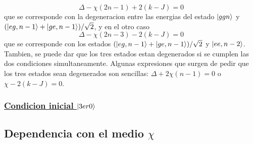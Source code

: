 \begin{equation}
    \Delta-\chi(2n-1)+2(k-J)=0
\end{equation}
que se corresponde con la degeneracion entre las energias del estado $\ket{ggn}$ y $(\ket{eg,n-1}+\ket{ge,n-1})/\sqrt{2}$, y en el otro caso
\begin{equation}
    \Delta-\chi(2n-3)-2(k-J)=0
\end{equation}
que se corresponde con los estados $(\ket{eg,n-1}+\ket{ge,n-1})/\sqrt{2}$ y $\ket{ee,n-2}$. Tambien, se puede dar que los tres estados estan degenerados si se cumplen las dos condiciones simultaneamente.
Algunas expresiones que surgen de pedir que los tres estados sean degenerados son sencillas: $\Delta+2\chi(n-1)=0$ o $\chi-2(k-J)=0$.

\subsubsection{\underline{Condicion inicial $\ket{3er0}$}}

\subsection{Dependencia con el medio $\chi$}
